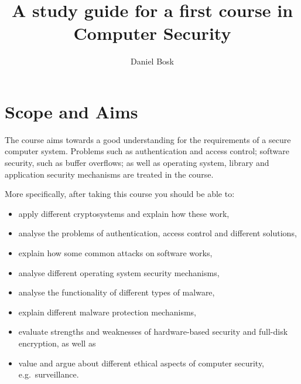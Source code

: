 \title{%
  A study guide for a first course in\\
  Computer Security
}
\author{%
  Daniel Bosk
}

\maketitle


\section{Scope and Aims}
\label{sec:aim}
The course aims towards a good understanding for the requirements of a secure 
computer system.
Problems such as authentication and access control; software security, such as 
buffer overflows; as well as operating system, library and application security 
mechanisms are treated in the course.

More specifically, after taking this course you should be able to:
\begin{itemize}
%  
%  
%  
%  
%  
%  
%  
%  
  \item apply different cryptosystems and explain how these work,
  \item analyse the problems of authentication, access control and different 
  solutions,
  \item explain how some common attacks on software works,
  \item analyse different operating system security mechanisms,
  \item analyse the functionality of different types of malware,
  \item explain different malware protection mechanisms,
  \item evaluate strengths and weaknesses of hardware-based security and 
    full-disk encryption, as well as
  \item value and argue about different ethical aspects of computer security, 
    e.g.\ surveillance.
\end{itemize}


